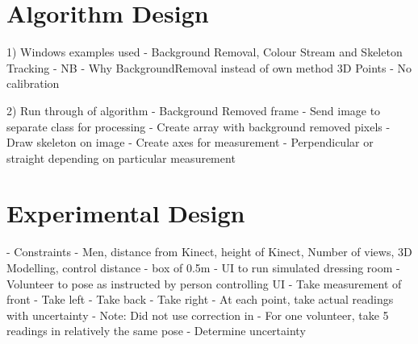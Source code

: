 \section{Algorithm Design}
1) Windows examples used - Background Removal, Colour Stream and Skeleton Tracking - NB - Why BackgroundRemoval instead of own method
3D Points - No calibration

2) Run through of algorithm
- Background Removed frame
- Send image to separate class for processing
- Create array with background removed pixels
- Draw skeleton on image
- Create axes for measurement - Perpendicular or straight depending on particular measurement

\section{Experimental Design}
- Constraints - Men, distance from Kinect, height of Kinect, Number of views, 3D Modelling, control distance - box of 0.5m
- UI to run simulated dressing room
- Volunteer to pose as instructed by person controlling UI
- Take measurement of front
- Take left
- Take back
- Take right 
- At each point, take actual readings with uncertainty
- Note: Did not use correction in \cite{nonContact2017}
- For one volunteer, take 5 readings in relatively the same pose - Determine uncertainty 